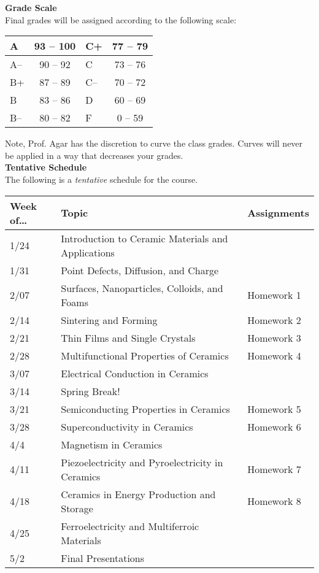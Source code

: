 \documentclass[11pt,letterpaper]{article}
\newcommand{\lefthead}[2]{\noindent\textbf{#1}\hfill\\[#2]}
\begin{document}
\lefthead{Grade Scale}{0.3cm}
\noindent Final grades will be assigned according to the following scale: \\
        \begin{center}
        \begin{tabular}{|l||c|l||c|} \hline
        A & 93 -- 100 & C+ & 77 -- 79 \\ \hline
        A-- & 90 -- 92 & C & 73 -- 76 \\ \hline
        B+ & 87 -- 89 & C-- & 70 -- 72 \\ \hline
        B & 83 -- 86 & D & 60 -- 69 \\ \hline
        B-- & 80 -- 82 & F & 0 -- 59 \\ \hline
        \end{tabular}
        \end{center} \vspace{0.3cm}
        
\noindent Note, Prof. Agar has the discretion to curve the class grades. Curves will never be applied in a way that decreases your grades.\\[.3 cm]

\lefthead{Tentative Schedule}{0.3cm}
\noindent The following is a \emph{tentative} schedule for the course.
	\begin{table}[H]
	\centering
	\begin{tabular}{l|l|l|} 
	Week of\dots & Topic & Assignments \\ \hline 
	1/24 & Introduction to Ceramic Materials and Applications & \\
	1/31 & Point Defects, Diffusion, and Charge &   \\
	2/07 & Surfaces, Nanoparticles, Colloids, and Foams &  Homework 1\\ 
	2/14 & Sintering and Forming & Homework 2  \\
	2/21 & Thin Films and Single Crystals & Homework 3  \\
	2/28 & Multifunctional Properties of Ceramics & Homework 4 \\
	3/07 & Electrical Conduction in Ceramics &  \\
	3/14 & Spring Break! &  \\
	3/21 & Semiconducting Properties in Ceramics & Homework 5 \\
	3/28 & Superconductivity in Ceramics &  Homework 6\\
	4/4 & Magnetism in Ceramics &  \\
	4/11 & Piezoelectricity and Pyroelectricity in Ceramics & Homework 7  \\
	4/18 & Ceramics in Energy Production and Storage & Homework 8 \\
	4/25 & Ferroelectricity and Multiferroic Materials &  \\
	5/2 & Final Presentations &  \\
	\end{tabular}
	\end{table} \vspace{0.3cm}
\end{document}
